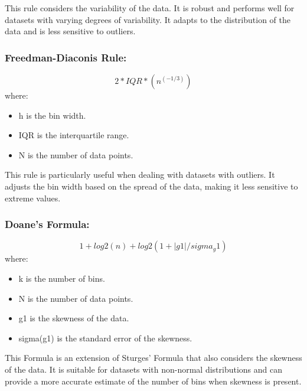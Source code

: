 This rule considers the variability of the data.
It is robust and performs well for datasets with varying degrees of variability. It adapts to the distribution of the data and is less sensitive to outliers.

\subsubsection{Freedman-Diaconis Rule:}
\begin{equation}
2 * IQR * (n^(-1/3))
\end{equation}
where:
\begin{itemize}
\item h is the bin width.
\item IQR is the interquartile range.
\item N is the number of data points.
\end{itemize}
This rule is particularly useful when dealing with datasets with outliers. It adjusts the bin width based on the spread of the data, making it less sensitive to extreme values.

\subsubsection{Doane’s Formula:}
\begin{equation}
    1 + log2(n) + log2(1 + |g1|/sigma_g1)
\end{equation}
where:
\begin{itemize}
\item k is the number of bins.
\item N is the number of data points.
\item g1 is the skewness of the data.
\item sigma(g1) is the standard error of the skewness.
\end{itemize}

This Formula is an extension of Sturges' Formula that also considers the skewness of the data. It is suitable for datasets with non-normal distributions and can provide a more accurate estimate of the number of bins when skewness is present.


